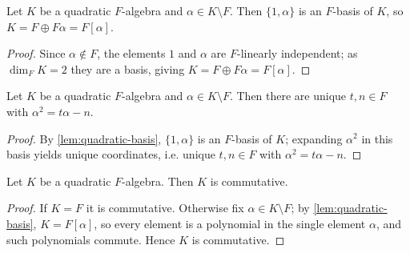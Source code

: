 \begin{lemma}
    \label{lem:quadratic-basis}
    Let $K$ be a quadratic $F$-algebra and $\alpha \in K \setminus F$. Then
    $\{1, \alpha\}$ is an $F$-basis of $K$, so $K = F \oplus F\alpha = F[\alpha]$.
\end{lemma}
\begin{proof}
    Since $\alpha \notin F$, the elements $1$ and $\alpha$ are $F$-linearly
    independent; as $\dim_F K = 2$ they are a basis, giving
    $K = F \oplus F\alpha = F[\alpha]$.
\end{proof}

\begin{lemma}
    \label{lem:quadratic-min-rel}
    Let $K$ be a quadratic $F$-algebra and $\alpha \in K \setminus F$. Then there
    are unique $t, n \in F$ with $\alpha^2 = t\alpha - n$.
\end{lemma}
\begin{proof}
    By \ref{lem:quadratic-basis}, $\{1,\alpha\}$ is an $F$-basis of $K$; expanding
    $\alpha^2$ in this basis yields unique coordinates, i.e. unique $t, n \in F$
    with $\alpha^2 = t\alpha - n$.
\end{proof}

\begin{lemma}
    \label{lem:quadratic-comm}
    Let $K$ be a quadratic $F$-algebra. Then $K$ is commutative.
\end{lemma}
\begin{proof}
    If $K = F$ it is commutative. Otherwise fix $\alpha \in K \setminus F$; by
    \ref{lem:quadratic-basis}, $K = F[\alpha]$, so every element is a polynomial in
    the single element $\alpha$, and such polynomials commute. Hence $K$ is
    commutative.
\end{proof}

